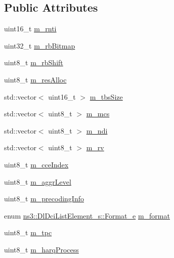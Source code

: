 \subsection*{Public Attributes}
\begin{DoxyCompactItemize}
\item 
uint16\+\_\+t \hyperlink{structns3_1_1DlDciListElement__s_a33101a0eb74676fd1cd07dd63bd6f01b}{m\+\_\+rnti}
\item 
uint32\+\_\+t \hyperlink{structns3_1_1DlDciListElement__s_a3237d17acb2c8464111fdf0f59b43558}{m\+\_\+rb\+Bitmap}
\item 
uint8\+\_\+t \hyperlink{structns3_1_1DlDciListElement__s_a7792272db603666d53aa2698862bd0e0}{m\+\_\+rb\+Shift}
\item 
uint8\+\_\+t \hyperlink{structns3_1_1DlDciListElement__s_a78440db6a3e1c0f1755a82642f8cbfb4}{m\+\_\+res\+Alloc}
\item 
std\+::vector$<$ uint16\+\_\+t $>$ \hyperlink{structns3_1_1DlDciListElement__s_ab9ef1b6fbcc023c6e74a7813c62739c9}{m\+\_\+tbs\+Size}
\item 
std\+::vector$<$ uint8\+\_\+t $>$ \hyperlink{structns3_1_1DlDciListElement__s_a772a153e3bb9a899520608889023067c}{m\+\_\+mcs}
\item 
std\+::vector$<$ uint8\+\_\+t $>$ \hyperlink{structns3_1_1DlDciListElement__s_a0857949554267ff5dc3bcd4dff681d57}{m\+\_\+ndi}
\item 
std\+::vector$<$ uint8\+\_\+t $>$ \hyperlink{structns3_1_1DlDciListElement__s_ae9bad42e5fd3d56dc70bc0187fea5f30}{m\+\_\+rv}
\item 
uint8\+\_\+t \hyperlink{structns3_1_1DlDciListElement__s_a0431897f8316445c2959d28c54aa8613}{m\+\_\+cce\+Index}
\item 
uint8\+\_\+t \hyperlink{structns3_1_1DlDciListElement__s_a88548756c98a182b9803e66ef79a5c93}{m\+\_\+aggr\+Level}
\item 
uint8\+\_\+t \hyperlink{structns3_1_1DlDciListElement__s_a1dcfb0ce930ca053f44a049f9d0fdfa3}{m\+\_\+precoding\+Info}
\item 
enum \hyperlink{structns3_1_1DlDciListElement__s_a5a9368fe0ff69530186a3a726e705176}{ns3\+::\+Dl\+Dci\+List\+Element\+\_\+s\+::\+Format\+\_\+e} \hyperlink{structns3_1_1DlDciListElement__s_a38181d49c559ad191565673b3f0a91da}{m\+\_\+format}
\item 
uint8\+\_\+t \hyperlink{structns3_1_1DlDciListElement__s_aee53e877b91346eaff966474c8bace8b}{m\+\_\+tpc}
\item 
uint8\+\_\+t \hyperlink{structns3_1_1DlDciListElement__s_a2d00d39c239b78b18be81473cfb15eee}{m\+\_\+harq\+Process}

\end{DoxyCompactItemize}
